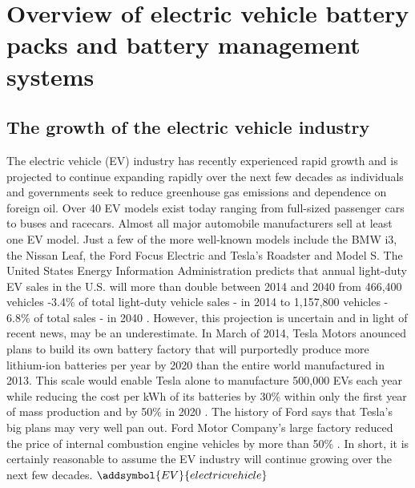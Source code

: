\chapter{Overview of electric vehicle battery packs and battery management systems}
	\section{The growth of the electric vehicle industry}
		The electric vehicle (EV) industry has recently experienced rapid growth and is projected to continue expanding rapidly over the next few decades as individuals and governments seek to reduce greenhouse gas emissions and dependence on foreign oil. Over 40 EV models exist today ranging from full-sized passenger cars to buses and racecars.  Almost all major automobile manufacturers sell at least one EV model. Just a few of the more well-known models include the BMW i3, the Nissan Leaf, the Ford Focus Electric and Tesla's Roadster and Model S. The United States Energy Information Administration predicts that annual light-duty EV sales in the U.S. will more than double between 2014 and 2040 from 466,400 vehicles -3.4\% of total light-duty vehicle sales - in 2014 to 1,157,800 vehicles - 6.8\% of total sales - in 2040 \cite{EIAEV}.  However, this projection is uncertain and in light of recent news, may be an underestimate. In March of 2014, Tesla Motors  anounced plans to build its own battery factory that will purportedly produce more lithium-ion batteries per year by 2020 than the entire world manufactured in 2013. This scale would enable Tesla alone to manufacture 500,000 EVs each year while reducing the cost per kWh of its batteries by 30\% within only the first year of mass production and by 50\% in 2020 \cite{Gigafactory}. The history of Ford says that Tesla's big plans may very well pan out. Ford Motor Company's large factory reduced the price of internal combustion engine vehicles by more than 50\% \cite{GreenTechTeslaFord}. In short, it is certainly reasonable to assume the EV industry will continue growing over the next few decades. 
		$\addsymbol{EV}{electric vehicle}$
%
